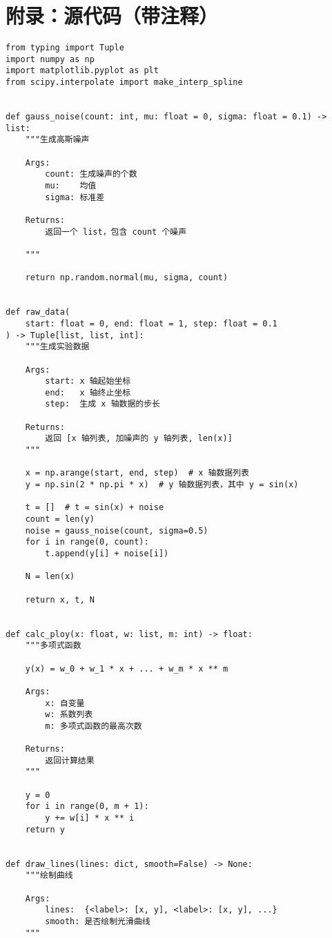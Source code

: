 \appendix

\section{附录：源代码（带注释）}

\begin{verbatim}
from typing import Tuple
import numpy as np
import matplotlib.pyplot as plt
from scipy.interpolate import make_interp_spline


def gauss_noise(count: int, mu: float = 0, sigma: float = 0.1) -> list:
    """生成高斯噪声

    Args:
        count: 生成噪声的个数
        mu:    均值
        sigma: 标准差

    Returns:
        返回一个 list，包含 count 个噪声

    """

    return np.random.normal(mu, sigma, count)


def raw_data(
    start: float = 0, end: float = 1, step: float = 0.1
) -> Tuple[list, list, int]:
    """生成实验数据

    Args:
        start: x 轴起始坐标
        end:   x 轴终止坐标
        step:  生成 x 轴数据的步长

    Returns:
        返回 [x 轴列表, 加噪声的 y 轴列表, len(x)]
    """

    x = np.arange(start, end, step)  # x 轴数据列表
    y = np.sin(2 * np.pi * x)  # y 轴数据列表，其中 y = sin(x)

    t = []  # t = sin(x) + noise
    count = len(y)
    noise = gauss_noise(count, sigma=0.5)
    for i in range(0, count):
        t.append(y[i] + noise[i])

    N = len(x)

    return x, t, N


def calc_ploy(x: float, w: list, m: int) -> float:
    """多项式函数

    y(x) = w_0 + w_1 * x + ... + w_m * x ** m

    Args:
        x: 自变量
        w: 系数列表
        m: 多项式函数的最高次数

    Returns:
        返回计算结果
    """

    y = 0
    for i in range(0, m + 1):
        y += w[i] * x ** i
    return y


def draw_lines(lines: dict, smooth=False) -> None:
    """绘制曲线

    Args:
        lines:  {<label>: [x, y], <label>: [x, y], ...}
        smooth: 是否绘制光滑曲线
    """


\end{verbatim}
